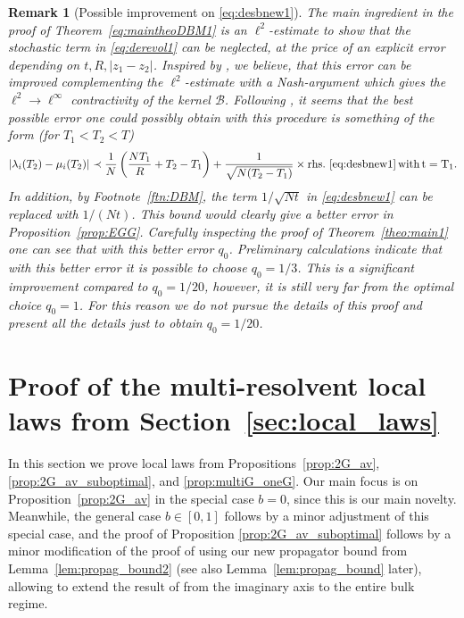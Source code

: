 \documentclass[10pt]{amsart}
\newtheorem{remark}[theorem]{Remark}
\numberwithin{equation}{section}
\begin{document}
\begin{remark}[Possible improvement on \eqref{eq:desbnew1}]\label{rem:DBM}
The main ingredient in the proof of Theorem~\ref{eq:maintheoDBM1} is an $\ell^2$-estimate to show that the stochastic term in \eqref{eq:derevol1} can be neglected, at the price of an explicit error depending on $t, R, |z_1-z_2|$. Inspired by \cite{cipolloni2022normal, marcinek2022high}, we believe, that this error can be improved complementing the $\ell^2$-estimate with a Nash-argument which gives the $\ell^2\to \ell^\infty$ contractivity of the kernel $\mathcal{B}$. Following \cite[Sections 6-7]{marcinek2022high}, it seems that the best possible error one could possibly obtain with this procedure is something of the form (for $T_1<T_2<T$)
\begin{equation}
\label{eq:firstb}
|\lambda_i(T_2)-\mu_i(T_2)|\prec \frac{1}{N}\left(\frac{NT_1}{R}+T_2-T_1\right)+\frac{1}{\sqrt{N(T_2-T_1)}}\times \mathrm{rhs. \,\, \eqref{eq:desbnew1}\, with \, t=T_1}.
\end{equation}
In addition, by Footnote~\ref{ftn:DBM}, the term $1/\sqrt{Nt}$ in \eqref{eq:desbnew1} can be replaced with $1/(Nt)$. This bound would clearly give a better error in Proposition~\ref{prop:EGG}. Carefully inspecting the proof of Theorem~\ref{theo:main1} one can see that with this better error $q_0$. Preliminary calculations indicate that with this better error it is possible to choose $q_0=1/3$. This is a significant improvement compared to $q_0=1/20$, however, it is still very far from the optimal choice $q_0=1$. For this reason we do not pursue the details of this proof and present all the details just to obtain $q_0=1/20$.

\end{remark}



\section{Proof of the multi-resolvent local laws from Section~\ref{sec:local_laws}}\label{sec:multiG_proof}


In this section we prove local laws from Propositions~\ref{prop:2G_av}, \ref{prop:2G_av_suboptimal}, and \ref{prop:multiG_oneG}. Our main focus is on Proposition~\ref{prop:2G_av} in the special case $b=0$, since this is our main novelty. Meanwhile, the general case $b\in [0,1]$ follows by a minor adjustment of this special case, and the proof of Proposition \ref{prop:2G_av_suboptimal} follows by a minor modification of the proof of \cite[Theorem~3.4]{nonHermdecay} using our new propagator bound from Lemma~\ref{lem:propag_bound2} (see also Lemma~\ref{lem:propag_bound} later), allowing to extend the result of \cite[Theorem~3.4]{nonHermdecay} from the imaginary axis to the entire bulk regime.
\end{document}
